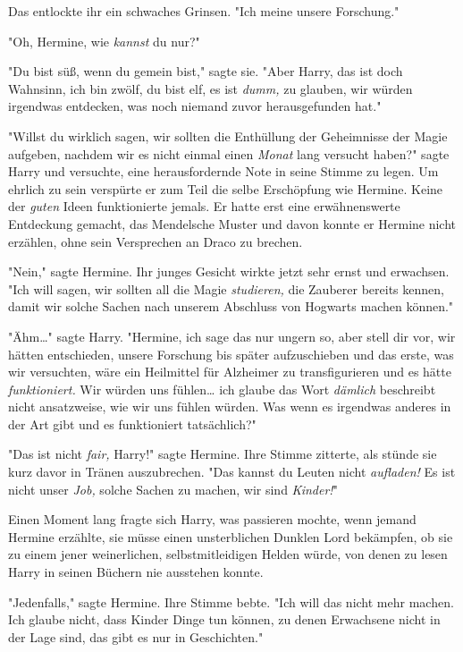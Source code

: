 {Das entlockte ihr ein schwaches Grinsen. "Ich meine unsere Forschung."

"Oh, Hermine, wie \emph{kannst} du nur?"

"Du bist süß, wenn du gemein bist," sagte sie. "Aber Harry, das ist doch Wahnsinn, ich bin zwölf, du bist elf, es ist \emph{dumm,} zu glauben, wir würden irgendwas entdecken, was noch niemand zuvor herausgefunden hat."

"Willst du wirklich sagen, wir sollten die Enthüllung der Geheimnisse der Magie aufgeben, nachdem wir es nicht einmal einen \emph{Monat} lang versucht haben?" sagte Harry und versuchte, eine herausfordernde Note in seine Stimme zu legen. Um ehrlich zu sein verspürte er zum Teil die selbe Erschöpfung wie Hermine. Keine der \emph{guten} Ideen funktionierte jemals. Er hatte erst eine erwähnenswerte Entdeckung gemacht, das Mendelsche Muster und davon konnte er Hermine nicht erzählen, ohne sein Versprechen an Draco zu brechen.

"Nein," sagte Hermine. Ihr junges Gesicht wirkte jetzt sehr ernst und erwachsen. "Ich will sagen, wir sollten all die Magie \emph{studieren,} die Zauberer bereits kennen, damit wir solche Sachen nach unserem Abschluss von Hogwarts machen können."

"Ähm…" sagte Harry. "Hermine, ich sage das nur ungern so, aber stell dir vor, wir hätten entschieden, unsere Forschung bis später aufzuschieben und das erste, was wir versuchten, wäre ein Heilmittel für Alzheimer zu transfigurieren und es hätte \emph{funktioniert.} Wir würden uns fühlen… ich glaube das Wort \emph{dämlich} beschreibt nicht ansatzweise, wie wir uns fühlen würden. Was wenn es irgendwas anderes in der Art gibt und es funktioniert tatsächlich?"

"Das ist nicht \emph{fair,} Harry!" sagte Hermine. Ihre Stimme zitterte, als stünde sie kurz davor in Tränen auszubrechen. "Das kannst du Leuten nicht \emph{aufladen!} Es ist nicht unser \emph{Job,} solche Sachen zu machen, wir sind \emph{Kinder!}"

Einen Moment lang fragte sich Harry, was passieren mochte, wenn jemand Hermine erzählte, sie müsse einen unsterblichen Dunklen Lord bekämpfen, ob sie zu einem jener weinerlichen, selbstmitleidigen Helden würde, von denen zu lesen Harry in seinen Büchern nie ausstehen konnte.

"Jedenfalls," sagte Hermine. Ihre Stimme bebte. "Ich will das nicht mehr machen. Ich glaube nicht, dass Kinder Dinge tun können, zu denen Erwachsene nicht in der Lage sind, das gibt es nur in Geschichten."

}
